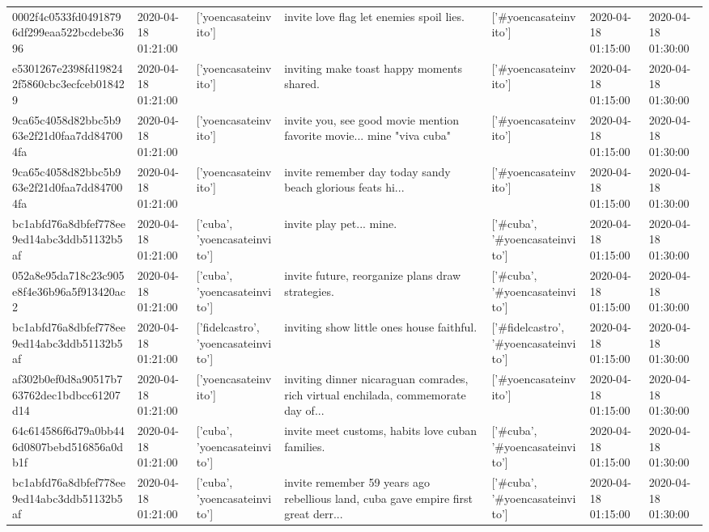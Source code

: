 \begin{tabular}{lllllll}
0002f4c0533fd04918796df299eaa522bcdebe3696 & 2020-04-18 01:21:00 & ['yoencasateinvito'] & invite love flag let enemies spoil lies. & ['#yoencasateinvito'] & 2020-04-18 01:15:00 & 2020-04-18 01:30:00 \\
e5301267e2398fd198242f5860cbc3ecfceb018429 & 2020-04-18 01:21:00 & ['yoencasateinvito'] & inviting make toast happy moments shared. & ['#yoencasateinvito'] & 2020-04-18 01:15:00 & 2020-04-18 01:30:00 \\
9ca65c4058d82bbc5b963e2f21d0faa7dd847004fa & 2020-04-18 01:21:00 & ['yoencasateinvito'] & invite you, see good movie mention favorite movie... mine "viva cuba" & ['#yoencasateinvito'] & 2020-04-18 01:15:00 & 2020-04-18 01:30:00 \\
9ca65c4058d82bbc5b963e2f21d0faa7dd847004fa & 2020-04-18 01:21:00 & ['yoencasateinvito'] & invite remember day today sandy beach glorious feats hi... & ['#yoencasateinvito'] & 2020-04-18 01:15:00 & 2020-04-18 01:30:00 \\
bc1abfd76a8dbfef778ee9ed14abc3ddb51132b5af & 2020-04-18 01:21:00 & ['cuba', 'yoencasateinvito'] & invite play pet... mine. & ['#cuba', '#yoencasateinvito'] & 2020-04-18 01:15:00 & 2020-04-18 01:30:00 \\
052a8e95da718c23c905e8f4e36b96a5f913420ac2 & 2020-04-18 01:21:00 & ['cuba', 'yoencasateinvito'] & invite future, reorganize plans draw strategies. & ['#cuba', '#yoencasateinvito'] & 2020-04-18 01:15:00 & 2020-04-18 01:30:00 \\
bc1abfd76a8dbfef778ee9ed14abc3ddb51132b5af & 2020-04-18 01:21:00 & ['fidelcastro', 'yoencasateinvito'] & inviting show little ones house faithful. & ['#fidelcastro', '#yoencasateinvito'] & 2020-04-18 01:15:00 & 2020-04-18 01:30:00 \\
af302b0ef0d8a90517b763762dec1bdbcc61207d14 & 2020-04-18 01:21:00 & ['yoencasateinvito'] & inviting dinner nicaraguan comrades, rich virtual enchilada, commemorate day of... & ['#yoencasateinvito'] & 2020-04-18 01:15:00 & 2020-04-18 01:30:00 \\
64c614586f6d79a0bb446d0807bebd516856a0db1f & 2020-04-18 01:21:00 & ['cuba', 'yoencasateinvito'] & invite meet customs, habits love cuban families. & ['#cuba', '#yoencasateinvito'] & 2020-04-18 01:15:00 & 2020-04-18 01:30:00 \\
bc1abfd76a8dbfef778ee9ed14abc3ddb51132b5af & 2020-04-18 01:21:00 & ['cuba', 'yoencasateinvito'] & invite remember 59 years ago rebellious land, cuba gave empire first great derr... & ['#cuba', '#yoencasateinvito'] & 2020-04-18 01:15:00 & 2020-04-18 01:30:00 \\

\end{tabular}
